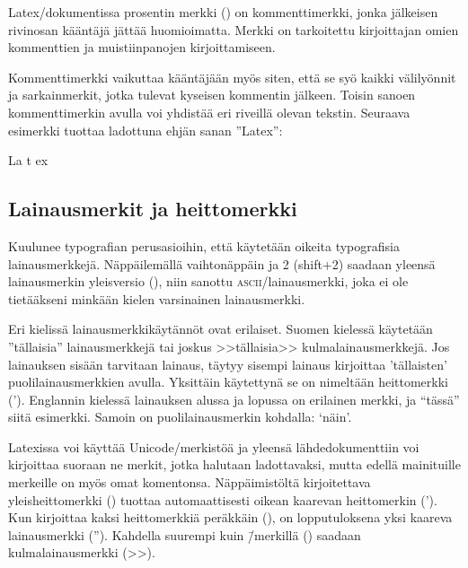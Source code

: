 Latex\-/dokumentissa prosentin merkki (\koodi{\%}) on kommenttimerkki,
jonka jälkeisen rivin\-osan kääntäjä jättää huomioimatta. Merkki on
tarkoitettu kirjoittajan omien kommenttien ja muistiinpanojen
kirjoittamiseen.

\begin{koodilohkosis}
\end{koodilohkosis}

Kommenttimerkki vaikuttaa kääntäjään myös siten, että se syö kaikki
välilyönnit ja sarkainmerkit, jotka tulevat kyseisen kommentin jälkeen.
Toisin sanoen kommenttimerkin avulla voi yhdistää eri riveillä olevan
tekstin. Seuraava esimerkki tuottaa ladottuna ehjän sanan ''Latex'':

\begin{koodilohkosis}
  La%
    t%
      ex
\end{koodilohkosis}

\subsection{Lainausmerkit ja heittomerkki}

Kuulunee typografian perus\-asioihin, että käytetään oikeita
typografisia lainausmerkkejä. Näppäilemällä vaihtonäppäin ja 2 (shift+2)
saadaan yleensä lainausmerkin yleisversio (\textquotedbl), niin sanottu
\textsc{ascii}\-/lainausmerkki, joka ei ole tietääkseni minkään kielen
varsinainen lainausmerkki.

Eri kielissä lainausmerkkikäytännöt ovat erilaiset. Suomen kielessä
käytetään ''tällaisia'' lainausmerkkejä tai joskus >>tällaisia>>
kulmalainausmerkkejä. Jos lainauksen sisään tarvitaan lainaus, täytyy
sisempi lainaus kirjoittaa 'tällaisten' puolilainausmerkkien avulla.
Yksittäin käytettynä se on nimeltään heittomerkki ('). Englannin
kielessä lainauksen alussa ja lopussa on erilainen merkki, ja ``tässä''
siitä esimerkki. Samoin on puolilainausmerkin kohdalla: `näin'.

Latexissa voi käyttää Unicode\-/merkistöä ja yleensä lähdedokumenttiin
voi kirjoittaa suoraan ne merkit, jotka halutaan ladottavaksi, mutta
edellä mainituille merkeille on myös omat komentonsa. Näppäimistöltä
kirjoitettava yleisheittomerkki () tuottaa automaattisesti
oikean kaarevan heittomerkin ('). Kun kirjoittaa kaksi heittomerkkiä
peräkkäin (), on lopputuloksena yksi kaareva lainausmerkki
(''). Kahdella suurempi kuin \=/merkillä (\koodi{>>}) saadaan
kulmalainausmerkki (>>).

